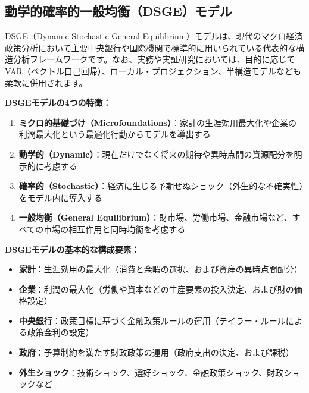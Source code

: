 \documentclass[
  japanese,
  lualatex,
  ja=standard,
  12pt,
  a4paper]{ltjsarticle}
\providecommand{\tightlist}{%
  \setlength{\itemsep}{0pt}\setlength{\parskip}{0pt}}
\begin{document}
\subsection{動学的確率的一般均衡（DSGE）モデル}\label{ux52d5ux5b66ux7684ux78baux7387ux7684ux4e00ux822cux5747ux8861dsgeux30e2ux30c7ux30eb}

DSGE（Dynamic Stochastic General
Equilibrium）モデルは、現代のマクロ経済政策分析において主要中央銀行や国際機関で標準的に用いられている代表的な構造分析フレームワークです。なお、実務や実証研究においては、目的に応じてVAR（ベクトル自己回帰）、ローカル・プロジェクション、半構造モデルなども柔軟に併用されます。


\textbf{DSGEモデルの4つの特徴：}

\begin{enumerate}
\def\labelenumi{\arabic{enumi}.}
\tightlist
\item
  \textbf{ミクロ的基礎づけ（Microfoundations）}：家計の生涯効用最大化や企業の利潤最大化という最適化行動からモデルを導出する
\item
  \textbf{動学的（Dynamic）}：現在だけでなく将来の期待や異時点間の資源配分を明示的に考慮する
\item
  \textbf{確率的（Stochastic）}：経済に生じる予期せぬショック（外生的な不確実性）をモデル内に導入する
\item
  \textbf{一般均衡（General
  Equilibrium）}：財市場、労働市場、金融市場など、すべての市場の相互作用と同時均衡を考慮する
\end{enumerate}


\textbf{DSGEモデルの基本的な構成要素：}

\begin{itemize}
\tightlist
\item
  \textbf{家計}：生涯効用の最大化（消費と余暇の選択、および資産の異時点間配分）
\item
  \textbf{企業}：利潤の最大化（労働や資本などの生産要素の投入決定、および財の価格設定）
\item
  \textbf{中央銀行}：政策目標に基づく金融政策ルールの運用（テイラー・ルールによる政策金利の設定）
\item
  \textbf{政府}：予算制約を満たす財政政策の運用（政府支出の決定、および課税）
\item
  \textbf{外生ショック}：技術ショック、選好ショック、金融政策ショック、財政ショックなど
\end{itemize}
\end{document}
